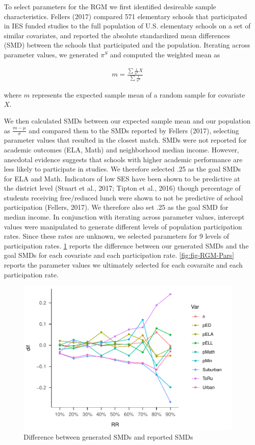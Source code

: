 \documentclass[man,floatsintext]{apa6}
\begin{document}
To select parameters for the RGM we first identified desireable sample characteristics. Fellers (2017) compared 571 elementary schools that participated in IES funded studies to the full population of U.S. elementary schools on a set of similar covariates, and reported the absolute standardized mean differences (SMD) between the schools that participated and the population. Iterating across parameter values, we generated \(\pi^S\) and computed the weighted mean as

\begin{align}
  m = \frac{\sum{\frac{1}{\pi^S} X}}{\sum{\frac{1}{\pi^S}}}
\end{align}

where \(m\) represents the expected sample mean of a random sample for covariate \(X\).

We then calculated SMDs between our expected sample mean and our population as \(\frac{m - \mu}{\sigma}\) and compared them to the SMDs reported by Fellers (2017), selecting parameter values that resulted in the closest match. SMDs were not reported for academic outcomes (ELA, Math) and neighborhood median income. However, anecdotal evidence suggests that schools with higher academic performance are less likely to participate in studies. We therefore selected .25 as the goal SMDs for ELA and Math. Indicators of low SES have been shown to be predictive at the district level (Stuart et al., 2017; Tipton et al., 2016) though percentage of students receiving free/reduced lunch were shown to not be predictive of school participation (Fellers, 2017). We therefore also set .25 as the goal SMD for median income. In conjunction with iterating across parameter values, intercept values were manipulated to generate different levels of population participation rates. Since these rates are unknown, we selected parameters for 9 levels of participation rates. \ref{fig:fig-SMD-goal} reports the difference between our generated SMDs and the goal SMDs for each covariate and each participation rate. \ref{fig:fig-RGM-Pars} reports the parameter values we ultimately selected for each covaraite and each participation rate.

\begin{figure}
\centering
\includegraphics{GenSamp_Paper_files/figure-latex/fig-SMD-goal-1.pdf}
\caption{\label{fig:fig-SMD-goal}Difference between generated SMDs and reported SMDs}
\end{figure}
\end{document}
